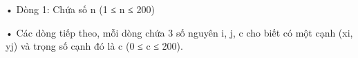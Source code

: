 • Dòng 1: Chứa số n (1 ≤ n ≤ 200)   


   • Các dòng tiếp theo, mỗi dòng chứa 3 số nguyên i, j, c cho biết có một cạnh (xi, yj) và trọng số cạnh đó là c (0 ≤ c ≤ 200).